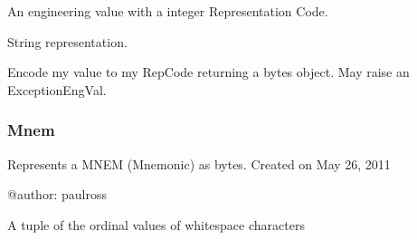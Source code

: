 \documentclass[letterpaper,10pt,english]{sphinxmanual}
\begin{document}
\begin{fulllineitems}
\label{\detokenize{ref/LIS/core/EngVal:TotalDepth.LIS.core.EngVal.EngValRc}}
An engineering value with a integer Representation Code.

\begin{fulllineitems}
\label{\detokenize{ref/LIS/core/EngVal:TotalDepth.LIS.core.EngVal.EngValRc.__str__}}
String representation.

\end{fulllineitems}


\begin{fulllineitems}
\label{\detokenize{ref/LIS/core/EngVal:TotalDepth.LIS.core.EngVal.EngValRc.encode}}
Encode my value to my RepCode returning a bytes object. May raise an ExceptionEngVal.

\end{fulllineitems}


\end{fulllineitems}



\subsubsection{Mnem}
\label{\detokenize{ref/LIS/core/Mnem:mnem}}\label{\detokenize{ref/LIS/core/Mnem::doc}}\label{\detokenize{ref/LIS/core/Mnem:module-TotalDepth.LIS.core.Mnem}}
Represents a MNEM (Mnemonic) as bytes.
Created on May 26, 2011

@author: paulross

\begin{fulllineitems}
\label{\detokenize{ref/LIS/core/Mnem:TotalDepth.LIS.core.Mnem.ORDS_WS}}
A tuple of the ordinal values of whitespace characters

\end{fulllineitems}

\end{document}
